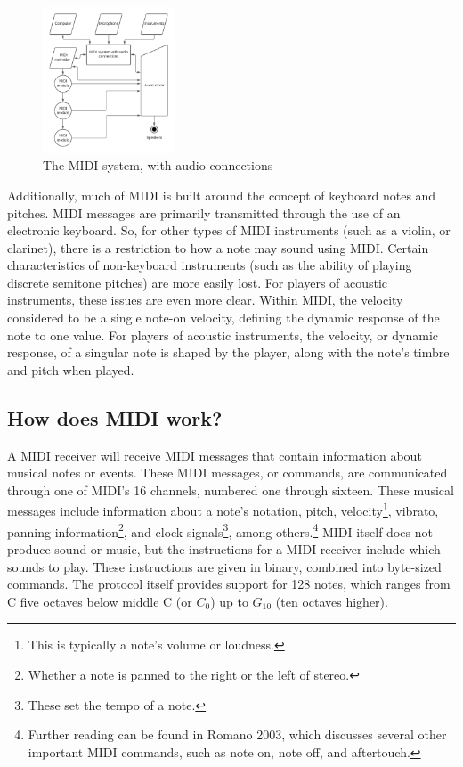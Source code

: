 \begin{figure}
	\centering
	\includegraphics[width=0.35\textwidth]{figures/midi-system-with-audio-connections.png}
	\caption{The MIDI system, with audio connections}
	\label{fig:midi-system-with-audio-connections}
\end{figure}

Additionally, much of MIDI is built around the concept of keyboard notes and pitches. MIDI messages are primarily transmitted through the use of an electronic keyboard. So, for other types of MIDI instruments (such as a violin, or clarinet), there is a restriction to how a note may sound using MIDI. Certain characteristics of non-keyboard instruments (such as the ability of playing discrete semitone pitches) are more easily lost. For players of acoustic instruments, these issues are even more clear. Within MIDI, the velocity considered to be a single note-on velocity, defining the dynamic response of the note to one value. For players of acoustic instruments, the velocity, or dynamic response, of a singular note is shaped by the player, along with the note's timbre and pitch when played\cite{Kirk_Hunt_2013}.

\subsection[How does MIDI work?]{How does MIDI work?}\label{section:how-midi}

A MIDI receiver will receive MIDI messages that contain information about musical notes or events. These MIDI messages, or commands, are communicated through one of MIDI's 16 channels, numbered one through sixteen. These musical messages include information about a note's notation, pitch, velocity\footnote{This is typically a note's volume or loudness.}, vibrato, panning information\footnote{Whether a note is panned to the right or the left of stereo.}, and clock signals\footnote{These set the tempo of a note.}, among others.\footnote{Further reading can be found in Romano 2003, which discusses several other important MIDI commands, such as note on, note off, and aftertouch.} MIDI itself does not produce sound or music, but the instructions for a MIDI receiver include which sounds to play. These instructions are given in binary, combined into byte-sized commands. The protocol itself provides support for 128 notes, which ranges from C five octaves below middle C (or $C_0$) up to $G_{10}$ (ten octaves higher).